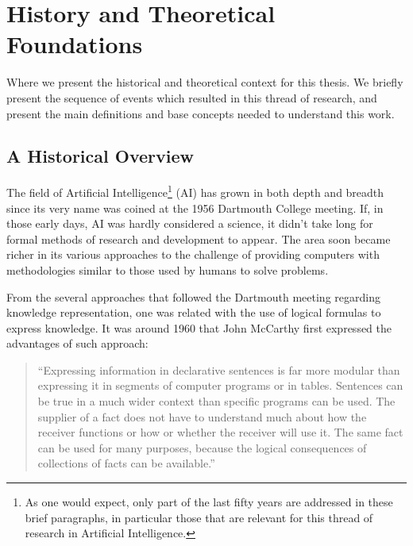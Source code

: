\chapter{History and Theoretical Foundations}
\label{cha:SoA}

\begin{ChapAbstract}
Where we present the historical and theoretical context for this thesis. We briefly present the sequence of events which resulted in this thread of research, and present the main definitions and base concepts needed to understand this work.
\end{ChapAbstract}


\section{A Historical Overview}
The field of Artificial Intelligence\footnote{As one would expect, only part of the last fifty years are addressed in these brief paragraphs, in particular those that are relevant for this thread of research in Artificial Intelligence.} (AI) has grown in both depth and breadth since its very name was coined at the 1956 Dartmouth College meeting\cite{dartmouth}. If, in those early days, AI was hardly considered a science, it didn't take long for formal methods of research and development to appear. The area soon became richer in its various approaches to the challenge of providing computers with methodologies similar to those used by humans to solve problems.

From the several approaches that followed the Dartmouth meeting regarding knowledge representation, one was related with the use of logical formulas to express knowledge. It was around 1960 that John McCarthy first expressed the advantages of such approach\cite{commonSense}:

\begin{quotation}
``Expressing information in declarative sentences is far more modular than expressing it in segments of computer programs or in tables. Sentences can be true in a much wider context than specific programs can be used. The supplier of a fact does not have to understand much about how the receiver functions or how or whether the receiver will use it. The same fact can be used for many purposes, because the logical consequences of collections of facts can be available.''
\end{quotation}

